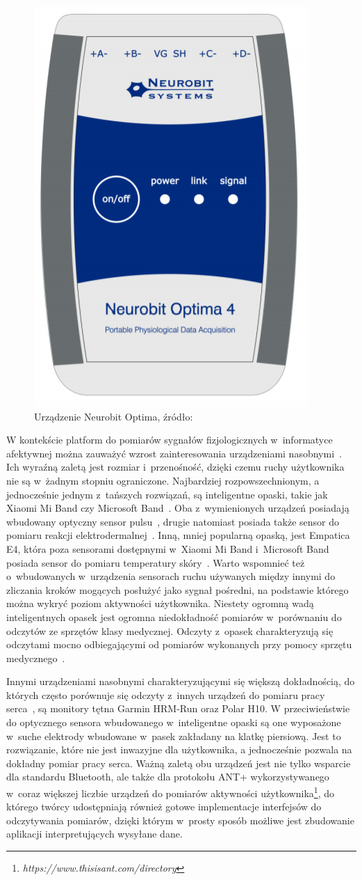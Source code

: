 \begin{figure}
	\centering
	\includegraphics[width=0.3\linewidth]{images/neurobit_optima.png}
	\caption{Urządzenie Neurobit Optima, źródło: \cite{neurobit_manual}}
	\label{fig:neurobit}
\end{figure}

W kontekście platform do pomiarów sygnałów fizjologicznych w~informatyce afektywnej można zauważyć wzrost zainteresowania urządzeniami nasobnymi~\cite{wearable_sensors_2018}. Ich wyraźną zaletą jest rozmiar i~przenośność, dzięki czemu ruchy użytkownika nie są w~żadnym stopniu ograniczone. Najbardziej rozpowszechnionym, a jednocześnie jednym z~tańszych rozwiązań, są inteligentne opaski, takie jak Xiaomi Mi Band czy Microsoft Band~\cite{wearable_sensors_2018}. Oba z~wymienionych urządzeń posiadają wbudowany optyczny sensor pulsu~\cite{miband_manual,microsoft_band_factsheet}, drugie natomiast posiada także sensor do pomiaru reakcji elektrodermalnej~\cite{microsoft_band_factsheet}. Inną, mniej popularną opaską, jest Empatica E4, która poza sensorami dostępnymi w~Xiaomi Mi Band i~Microsoft Band posiada sensor do pomiaru temperatury skóry~\cite{empatica_manual}. Warto wspomnieć też o~wbudowanych w~urządzenia sensorach ruchu używanych między innymi do zliczania kroków mogących posłużyć jako sygnał pośredni, na podstawie którego można wykryć poziom aktywności użytkownika. Niestety ogromną wadą inteligentnych opasek jest ogromna niedokładność pomiarów w~porównaniu do odczytów ze sprzętów klasy medycznej. Odczyty z~opasek charakteryzują się odczytami mocno odbiegającymi od pomiarów wykonanych przy pomocy sprzętu medycznego~\cite{wearable_sensors_2018,accuracy_of_wearables_hr}.

Innymi urządzeniami nasobnymi charakteryzującymi się większą dokładnością, do których często porównuje się odczyty z~innych urządzeń do pomiaru pracy serca~\cite{wearable_sensors_2018,accuracy_of_wearables_hr}, są monitory tętna Garmin HRM-Run oraz Polar H10. W przeciwieństwie do optycznego sensora wbudowanego w~inteligentne opaski są one wyposażone w~suche elektrody wbudowane w~pasek zakładany na klatkę piersiową\cite{polar_manual,garmin_manual}. Jest to rozwiązanie, które nie jest inwazyjne dla użytkownika, a jednocześnie pozwala na dokładny pomiar pracy serca. Ważną zaletą obu urządzeń jest nie tylko wsparcie dla standardu Bluetooth, ale także dla protokołu ANT+ wykorzystywanego w~coraz większej liczbie urządzeń do pomiarów aktywności użytkownika\footnote{\textit{https://www.thisisant.com/directory}}, do którego twórcy udostępniają również gotowe implementacje interfejsów do odczytywania pomiarów, dzięki którym w~prosty sposób możliwe jest zbudowanie aplikacji interpretujących wysyłane dane.

